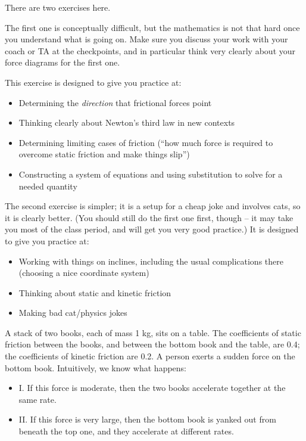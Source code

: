 \documentclass[12pt]{article}
\begin{document}
		\Large
		\centerline{}
		\normalsize
		\centerline{}
		
		
There are two exercises here.


\vspace{1cm}

The first one is conceptually difficult, but the mathematics is not that hard once you understand what is going on. Make sure you discuss your work with your coach or TA at the checkpoints, and in particular think very clearly about your force diagrams for the first one.

This exercise is designed to give you practice at:

\begin{itemize}
	\item Determining the {\it direction} that frictional forces point
	\item Thinking clearly about Newton's third law in new contexts
	\item Determining limiting cases of friction (``how much force is required to overcome static friction and make things slip'')
	\item Constructing a system of equations and using substitution to solve for a needed quantity
\end{itemize}

\vspace{3cm}

The second exercise is simpler; it is a setup for a cheap joke and involves cats, so it is clearly better. (You should still do the first one first, though -- it may take you most of the class period, and will get you very good practice.) It is designed to give you practice at:

\begin{itemize}
	\item Working with things on inclines, including the usual complications there (choosing a nice coordinate system)
	\item Thinking about static and kinetic friction
	\item Making bad cat/physics jokes

\end{itemize}

\newpage

		
		A stack of two books, each of mass 1 kg, sits on a table. The coefficients of static friction between the books, and between the bottom book and the table, are 0.4; the coefficients of kinetic friction are 0.2. A person exerts a sudden force on the bottom book. Intuitively, we know what happens:
		\begin{itemize}
			\item{I. If this force is moderate, then the two books accelerate together at the same rate.}
			\item{II. If this force is very large, then the bottom book is yanked out from beneath the top one, and they accelerate at different rates.}
		\end{itemize}
		
\end{document}

